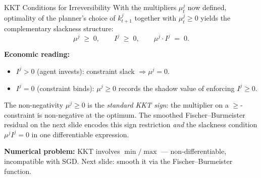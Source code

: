 \documentclass[aspectratio=169,11pt]{beamer}
\newcommand{\emphc}[1]{\textcolor{harvardcrimson}{#1}}
\begin{document}
\begin{frame}{KKT Conditions for Irreversibility}
With the multipliers $\mu_t^j$ now defined, optimality of the planner's choice of $k_{t+1}^j$ together with $\mu_t^j \geq 0$ yields the \emphc{complementary slackness} structure:
\[
\mu^j \;\geq\; 0, \qquad I^j \;\geq\; 0, \qquad \mu^j \cdot I^j \;=\; 0.
\]

\smallskip
\textbf{Economic reading:}
\begin{itemize}\itemsep2pt
    \item $I^j > 0$ (agent invests): constraint slack $\Rightarrow \mu^j = 0$.
    \item $I^j = 0$ (constraint binds): $\mu^j \geq 0$ records the shadow value of enforcing $I^j \geq 0$.
\end{itemize}

\vspace{0.2em}
{\footnotesize The non-negativity $\mu^j \geq 0$ is the \emph{standard KKT sign}: the multiplier on a $\geq$-constraint is non-negative at the optimum.  The smoothed Fischer--Burmeister residual on the next slide encodes this sign restriction \emph{and} the slackness condition $\mu^j I^j = 0$ in one differentiable expression.}

\vspace{0.3em}
\textbf{Numerical problem:} KKT involves $\min/\max$ --- \emphc{non-differentiable}, incompatible with SGD. Next slide: smooth it via the Fischer--Burmeister function.
\end{frame}
\end{document}
